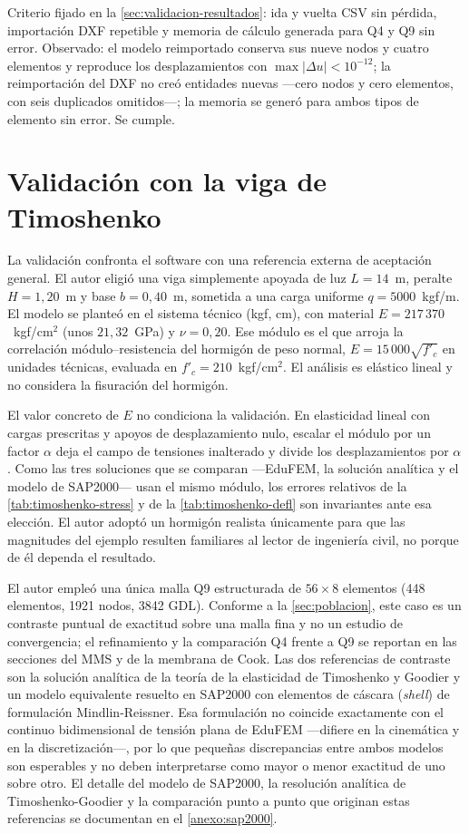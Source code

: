 Criterio fijado en la \autoref{sec:validacion-resultados}: ida y vuelta CSV sin pérdida, importación DXF repetible y memoria de cálculo generada para Q4 y Q9 sin error. Observado: el modelo reimportado conserva sus nueve nodos y cuatro elementos y reproduce los desplazamientos con $\max|\Delta u| < 10^{-12}$; la reimportación del DXF no creó entidades nuevas —cero nodos y cero elementos, con seis duplicados omitidos—; la memoria se generó para ambos tipos de elemento sin error. Se cumple.

\section{Validación con la viga de Timoshenko}
\label{sec:timoshenko}

La validación confronta el software con una referencia externa de aceptación general. El autor eligió una viga simplemente apoyada de luz $L = 14$~m, peralte $H = 1{,}20$~m y base $b = 0{,}40$~m, sometida a una carga uniforme $q = 5000$~kgf/m. El modelo se planteó en el sistema técnico (kgf, cm), con material $E = 217\,370$~kgf/cm$^2$ (unos $21{,}32$~GPa) y $\nu = 0{,}20$. Ese módulo es el que arroja la correlación módulo--resistencia del hormigón de peso normal, $E = 15\,000\sqrt{f'_c}$ en unidades técnicas, evaluada en $f'_c = 210$~kgf/cm$^2$. El análisis es elástico lineal y no considera la fisuración del hormigón.

El valor concreto de $E$ no condiciona la validación. En elasticidad lineal con cargas prescritas y apoyos de desplazamiento nulo, escalar el módulo por un factor $\alpha$ deja el campo de tensiones inalterado y divide los desplazamientos por $\alpha$. Como las tres soluciones que se comparan ---EduFEM, la solución analítica y el modelo de SAP2000--- usan el mismo módulo, los errores relativos de la \autoref{tab:timoshenko-stress} y de la \autoref{tab:timoshenko-defl} son invariantes ante esa elección. El autor adoptó un hormigón realista únicamente para que las magnitudes del ejemplo resulten familiares al lector de ingeniería civil, no porque de él dependa el resultado.

El autor empleó una única malla Q9 estructurada de $56\times8$ elementos (448 elementos, 1921 nodos, 3842 GDL). Conforme a la \autoref{sec:poblacion}, este caso es un contraste puntual de exactitud sobre una malla fina y no un estudio de convergencia; el refinamiento y la comparación Q4 frente a Q9 se reportan en las secciones del MMS y de la membrana de Cook. Las dos referencias de contraste son la solución analítica de la teoría de la elasticidad de Timoshenko y Goodier \autocite[art.~21, pp.~39-43]{timoshenko1970elasticity} y un modelo equivalente resuelto en SAP2000 \autocite[p.~179]{csi2017sap2000} con elementos de cáscara (\emph{shell}) de formulación Mindlin-Reissner. Esa formulación no coincide exactamente con el continuo bidimensional de tensión plana de EduFEM —difiere en la cinemática y en la discretización—, por lo que pequeñas discrepancias entre ambos modelos son esperables y no deben interpretarse como mayor o menor exactitud de uno sobre otro. El detalle del modelo de SAP2000, la resolución analítica de Timoshenko-Goodier y la comparación punto a punto que originan estas referencias se documentan en el \autoref{anexo:sap2000}.

